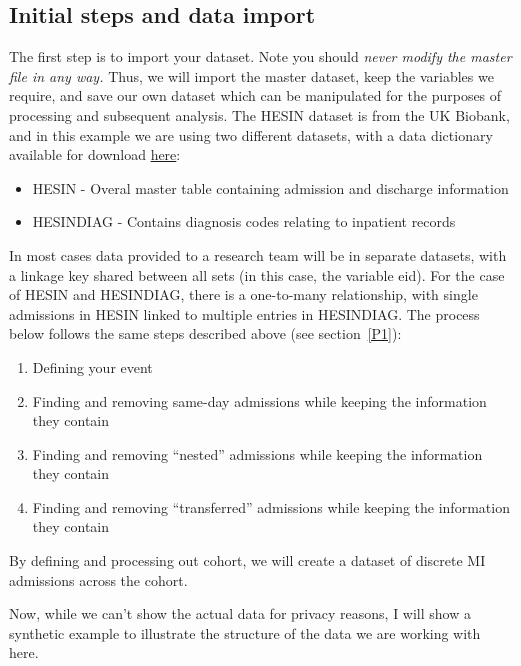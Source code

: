 \documentclass[11pt]{article}
\begin{document}
\subsection{Initial steps and data import}
The first step is to import your dataset. Note you should 
\emph{never modify the master file in any way.}
Thus, we will import the master dataset, keep the variables we require, 
and save our own dataset which can be manipulated for the purposes of processing and subsequent analysis.
The HESIN dataset is from the UK Biobank, and in this example we are using two different datasets, 
with a data dictionary available for download \color{blue} \href{https://biobank.ndph.ox.ac.uk/ukb/refer.cgi?id=141140}{here}\color{black}:
\begin{itemize}
	\item HESIN - Overal master table containing admission and discharge information
	\item HESIN\textunderscore DIAG - Contains diagnosis codes relating to inpatient records 
\end{itemize}
In most cases data provided to a research team will be in separate datasets, 
with a linkage key shared between all sets (in this case, the variable eid). 
For the case of HESIN and HESIN\textunderscore DIAG, there is a one-to-many relationship, 
with single admissions in HESIN linked to multiple entries in HESIN\textunderscore DIAG. 
The process below follows the same steps described above (see section~\ref{P1}):
\begin{enumerate}
\item Defining your event
\item Finding and removing same-day admissions while keeping the information they contain
\item Finding and removing ``nested'' admissions while keeping the information they contain
\item Finding and removing ``transferred'' admissions while keeping the information they contain
\end{enumerate}
By defining and processing out cohort, we will create a dataset of discrete MI admissions across the cohort.


\color{Blue4}
\begin{stlog}\end{stlog}
\color{black}

Now, while we can't show the actual data for privacy reasons, 
I will show a synthetic example to illustrate the structure of
the data we are working with here. 
\end{document}
